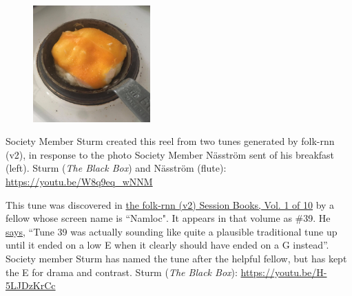 \documentclass[a4paper,notitlepage,twoside]{book}
\begin{document}
{}  
  
\hypertarget{reel:DresstheEggwithaHat}{}
\begin{figure}
\vspace{-0.3in}
\includegraphics[width=0.4\textwidth]{eggwithahat.jpg}
\end{figure}
Society Member Sturm created this reel from 
two tunes generated by folk-rnn (v2),
in response to the photo Society Member Näsström
sent of his breakfast (left).
Sturm ({\em The Black Box}) and Näsström (flute): \url{https://youtu.be/W8q9eq_wNNM}
\clearpage

{}  
  
\hypertarget{reel:Namlocs}{}
This tune was discovered in \href{https://highnoongmt.wordpress.com/2018/01/05/volumes-1-20-of-folk-rnn-v1-transcriptions}{the folk-rnn (v2) Session Books, Vol. 1 of 10}
by a fellow whose screen name is ``Namloc". 
It appears in that volume as \#39. 
He \href{https://thesession.org/discussions/39604}{says}, ``Tune 39 was actually sounding 
like quite a plausible traditional tune up until it ended on a low E 
when it clearly should have ended on a G instead''. 
Society member Sturm has named the tune after the helpful fellow, 
but has kept the E for drama and contrast.
Sturm ({\em The Black Box}): \url{https://youtu.be/H-5LJDzKrCc}

\clearpage
\end{document}
